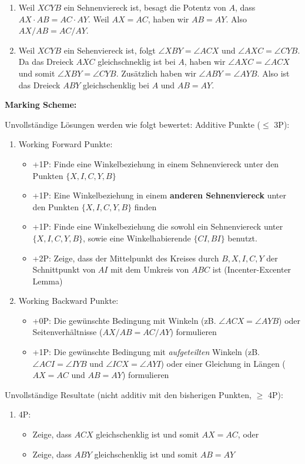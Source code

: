 {\begin{enumerate}
    \item Weil $XCYB$ ein Sehnenviereck ist, besagt die Potentz von $A$, dass $AX\cdot AB=AC\cdot AY$. Weil $AX=AC$, haben wir $AB=AY$. Also $AX/AB=AC/AY$.
    \item Weil $XCYB$ ein Sehenviereck ist, folgt $\angle XBY=\angle ACX$ und $\angle AXC=\angle CYB$. Da das Dreieck $AXC$ gleichschneklig ist bei $A$, haben wir $\angle AXC=\angle ACX$ und somit $\angle XBY=\angle CYB$. Zusätzlich haben wir $\angle ABY=\angle AYB$. Also ist das Dreieck $ABY$ gleichschenklig bei $A$ und $AB=AY$.
\end{enumerate}

\textbf{Marking Scheme:}

Unvollständige Lösungen werden wie folgt bewertet:
Additive Punkte ($\leq$ 3P):
\begin{enumerate}
    \item Working Forward Punkte:

\begin{itemize}
    \item +1P: Finde eine Winkelbeziehung in einem Sehnenviereck unter den Punkten $\{X,I,C,Y,B\}$
    \item +1P: Eine Winkelbeziehung in einem \textbf{anderen Sehnenviereck} unter den Punkten $\{X,I,C,Y,B\}$ finden
    \item +1P: Finde eine Winkelbeziehung die sowohl ein Sehnenviereck unter $\{X,I,C,Y,B\}$, sowie eine Winkelhabierende $\{CI,BI\}$ benutzt.
    \item +2P: Zeige, dass der Mittelpunkt des Kreises durch $B,X,I,C,Y$ der Schnittpunkt von $AI$ mit dem Umkreis von $ABC$ ist (Incenter-Excenter Lemma)
\end{itemize}

    \item Working Backward Punkte:
\begin{itemize}
    \item +0P: Die gewünschte Bedingung mit Winkeln (zB. $\angle ACX=\angle AYB$) oder Seitenverhältnisse ($AX/AB=AC/AY$) formulieren
    \item +1P: Die gewünschte Bedingung mit \emph{aufgeteilten} Winkeln (zB. $\angle ACI=\angle IYB$ und $\angle ICX=\angle AYI$) oder einer Gleichung in Längen ($AX=AC$ und $AB=AY$) formulieren
\end{itemize}

\end{enumerate}

Unvollständige Resultate (nicht additiv mit den bisherigen Punkten, $\geq$ 4P):
\begin{enumerate}
\item 4P:
\begin{itemize}
    \item Zeige, dass $ACX$ gleichschenklig ist und somit $AX=AC$, oder
    \item Zeige, dass $ABY$ gleichschenklig ist und somit $AB=AY$
\end{itemize}


\end{enumerate}}
